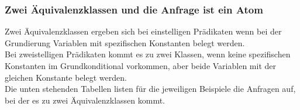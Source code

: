 \documentclass[a4paper, 11pt]{book}
\begin{document}
\subsubsection {Zwei Äquivalenzklassen und die Anfrage ist ein Atom} \label{Atom_zweiKlassen}

	Zwei Äquivalenzklassen ergeben sich bei einstelligen Prädikaten wenn bei der Grundierung Variablen mit spezifischen Konstanten belegt werden. \\
	Bei zweistelligen Prädikaten kommt es zu zwei Klassen, wenn keine spezifischen Konstanten im Grundkonditional vorkommen, aber beide Variablen mit der gleichen Konstante belegt werden.\\
	Die unten stehenden Tabellen listen für die jeweiligen Beispiele die Anfragen auf, bei der es zu zwei Äquivalenzklassen kommt.




\fontsize{11pt}{13.2pt}\selectfont

\setlongtables
\end{document}
